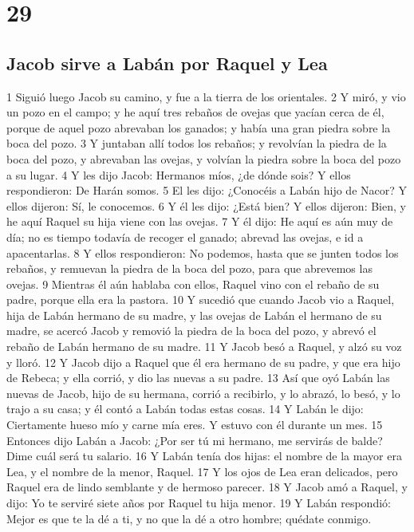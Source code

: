 \chapter{29}

\section*{Jacob sirve a Labán por Raquel y Lea}

1 Siguió luego Jacob su camino, y fue a la tierra de los orientales.
2 Y miró, y vio un pozo en el campo; y he aquí tres rebaños de ovejas que yacían cerca de él, porque de aquel pozo abrevaban los ganados; y había una gran piedra sobre la boca del pozo.
3 Y juntaban allí todos los rebaños; y revolvían la piedra de la boca del pozo, y abrevaban las ovejas, y volvían la piedra sobre la boca del pozo a su lugar.
4 Y les dijo Jacob: Hermanos míos, ¿de dónde sois? Y ellos respondieron: De Harán somos.
5 El les dijo: ¿Conocéis a Labán hijo de Nacor? Y ellos dijeron: Sí, le conocemos.
6 Y él les dijo: ¿Está bien? Y ellos dijeron: Bien, y he aquí Raquel su hija viene con las ovejas.
7 Y él dijo: He aquí es aún muy de día; no es tiempo todavía de recoger el ganado; abrevad las ovejas, e id a apacentarlas.
8 Y ellos respondieron: No podemos, hasta que se junten todos los rebaños, y remuevan la piedra de la boca del pozo, para que abrevemos las ovejas.
9 Mientras él aún hablaba con ellos, Raquel vino con el rebaño de su padre, porque ella era la pastora.
10 Y sucedió que cuando Jacob vio a Raquel, hija de Labán hermano de su madre, y las ovejas de Labán el hermano de su madre, se acercó Jacob y removió la piedra de la boca del pozo, y abrevó el rebaño de Labán hermano de su madre.
11 Y Jacob besó a Raquel, y alzó su voz y lloró.
12 Y Jacob dijo a Raquel que él era hermano de su padre, y que era hijo de Rebeca; y ella corrió, y dio las nuevas a su padre.
13 Así que oyó Labán las nuevas de Jacob, hijo de su hermana, corrió a recibirlo, y lo abrazó, lo besó, y lo trajo a su casa; y él contó a Labán todas estas cosas.
14 Y Labán le dijo: Ciertamente hueso mío y carne mía eres. Y estuvo con él durante un mes.
15 Entonces dijo Labán a Jacob: ¿Por ser tú mi hermano, me servirás de balde? Dime cuál será tu salario.
16 Y Labán tenía dos hijas: el nombre de la mayor era Lea, y el nombre de la menor, Raquel.
17 Y los ojos de Lea eran delicados, pero Raquel era de lindo semblante y de hermoso parecer.
18 Y Jacob amó a Raquel, y dijo: Yo te serviré siete años por Raquel tu hija menor.
19 Y Labán respondió: Mejor es que te la dé a ti, y no que la dé a otro hombre; quédate conmigo.
